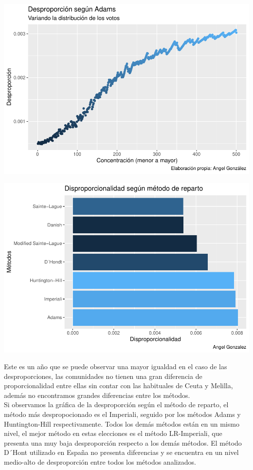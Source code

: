 \documentclass[12pt,a4paper,]{book}
\numberwithin{dummy}{section}
\theoremstyle{ocrenumbox}
\theoremstyle{blacknumex}
\theoremstyle{blacknumbox}
\theoremstyle{ocrenum}
\theoremstyle{ocrenum}
\begin{document}
\begin{center}\includegraphics[width=1\linewidth]{figurasR/unnamed-chunk-33-1} \end{center}

\begin{center}\includegraphics[width=1\linewidth]{figurasR/unnamed-chunk-33-2} \end{center}

Este es un año que se puede observar una mayor igualdad en el caso de
las desproporciones, las comunidades no tienen una gran diferencia de
proporcionalidad entre ellas sin contar con las habituales de Ceuta y
Melilla, además no encontramos grandes diferencias entre los métodos.\\
Si observamos la gráfica de la desproporción según el método de reparto,
el método más despropocionado es el Imperiali, seguido por los métodos
Adams y Huntington-Hill respectivamente. Todos los demás métodos están
en un mismo nivel, el mejor método en estas elecciones es el método
LR-Imperiali, que presenta una muy baja desproporción respecto a los
demás métodos. El método D´Hont utilizado en España no presenta
diferencias y se encuentra en un nivel medio-alto de desproporción entre
todos los métodos analizados.
\end{document}
